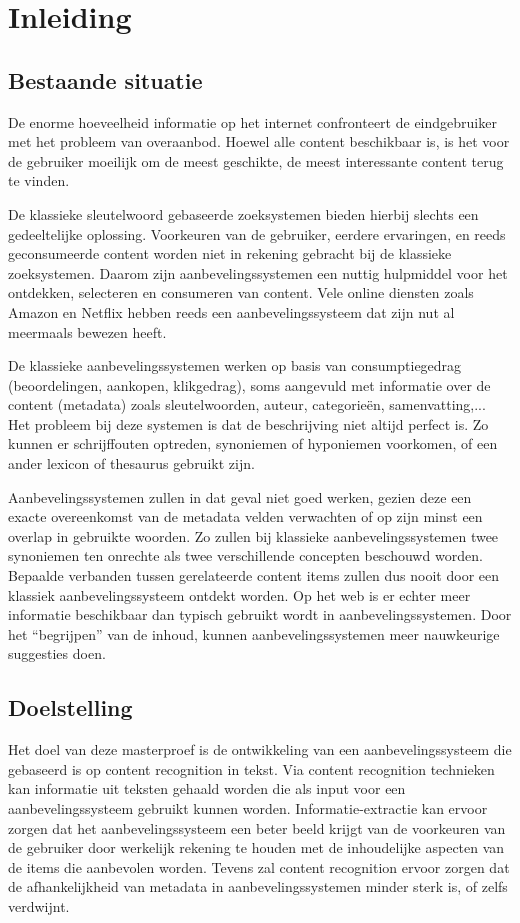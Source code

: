 \chapter{Inleiding}

\section{Bestaande situatie}
De enorme hoeveelheid informatie op het internet confronteert de eindgebruiker met het probleem van overaanbod.
Hoewel alle content beschikbaar is, is het voor de gebruiker moeilijk om de meest geschikte, de meest interessante
content terug te vinden. 

De klassieke sleutelwoord gebaseerde zoeksystemen bieden hierbij slechts een gedeeltelijke
oplossing. Voorkeuren van de gebruiker, eerdere ervaringen, en reeds geconsumeerde content worden niet in
rekening gebracht bij de klassieke zoeksystemen. Daarom zijn aanbevelingssystemen een nuttig hulpmiddel voor het
ontdekken, selecteren en consumeren van content. Vele online diensten zoals Amazon \cite{Everything2012} en Netflix \cite{Bennett2007} hebben
reeds een aanbevelingssysteem dat zijn nut al meermaals bewezen heeft. 

De klassieke aanbevelingssystemen werken op basis van consumptiegedrag (beoordelingen, aankopen, klikgedrag),
soms aangevuld met informatie over de content (metadata) zoals sleutelwoorden, auteur, categorie\"en, samenvatting,... Het probleem bij deze systemen is dat de beschrijving niet altijd perfect is. Zo kunnen er schrijffouten optreden, synoniemen of hyponiemen voorkomen, of een ander lexicon of thesaurus gebruikt zijn.

Aanbevelingssystemen zullen in dat geval niet goed werken, gezien deze een exacte overeenkomst van de metadata
velden verwachten of op zijn minst een overlap in gebruikte woorden. Zo zullen bij klassieke aanbevelingssystemen
twee synoniemen ten onrechte als twee verschillende concepten beschouwd worden. Bepaalde verbanden tussen
gerelateerde content items zullen dus nooit door een klassiek aanbevelingssysteem ontdekt worden.
Op het web is er echter meer informatie beschikbaar dan typisch gebruikt wordt in aanbevelingssystemen. Door het “begrijpen” van de inhoud, kunnen aanbevelingssystemen meer nauwkeurige suggesties doen.

\section{Doelstelling}
Het doel van deze masterproef is de ontwikkeling van een aanbevelingssysteem die gebaseerd is op content
recognition in tekst. Via content recognition technieken kan informatie uit teksten gehaald worden die als input voor
een aanbevelingssysteem gebruikt kunnen worden. Informatie-extractie kan ervoor zorgen dat het
aanbevelingssysteem een beter beeld krijgt van de voorkeuren van de gebruiker door werkelijk rekening te houden
met de inhoudelijke aspecten van de items die aanbevolen worden. Tevens zal content recognition ervoor zorgen dat
de afhankelijkheid van metadata in aanbevelingssystemen minder sterk is, of zelfs verdwijnt.

